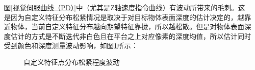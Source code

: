 \documentclass[fontset=fandol,type=bachelor,campus=harbin,bsmainpagenumberline=true]{hithesisbook}
\begin{document}
图\ref{视觉伺服曲线（PD）}中（尤其是Z轴速度指令曲线）有波动所带来的毛刺。这是因为自定义特征分布松紧情况是取决于对目标物体表面深度的估计决定的，越靠近物体，当前自定义特征分布越向期望特征靠拢，所以越松散。但是对物体表面深度估计的方式是不断迭代非白色且在平台之上对应像素的深度均值，所以估计同时受到颜色和深度测量波动影响，如图\ref{自定义特征点分布松紧程度波动}所示：
\begin{figure}[h]
	\centering
	\caption{自定义特征点分布松紧程度波动}
	\label{自定义特征点分布松紧程度波动}
\end{figure}
\end{document}
